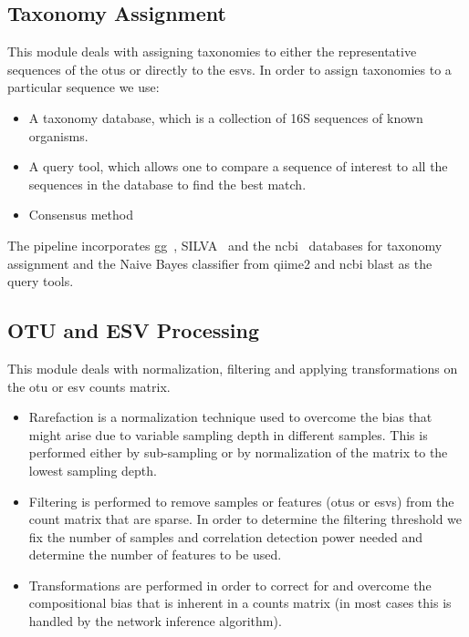   \subsection*{Taxonomy Assignment}
  \vspace{-5mm}
  This module deals with assigning taxonomies to either the representative sequences of the \ac{otu}s or directly to the \ac{esv}s.
  In order to assign taxonomies to a particular sequence we use:
  \begin{itemize}
    \item A taxonomy database, which is a collection of 16S sequences of known organisms.
    \item A query tool, which allows one to compare a sequence of interest to all the sequences in the database to find the best match.
    \item Consensus method
  \end{itemize}
  The pipeline incorporates \ac{gg}~\cite{DeSantis2006}, SILVA~\cite{Quast2012} and the \ac{ncbi}~\cite{Sayers2009} databases for taxonomy assignment and the Naive Bayes classifier from \ac{qiime2} and \ac{ncbi} blast as the query tools.

  \subsection*{OTU and ESV Processing}
  \vspace{-5mm}
  This module deals with normalization, filtering and applying transformations on the \ac{otu} or \ac{esv} counts matrix.
  \begin{itemize}
    \item Rarefaction is a normalization technique used to overcome the bias that might arise due to variable sampling depth in different samples. This is performed either by sub-sampling or by normalization of the matrix to the lowest sampling depth.
    \item Filtering is performed to remove samples or features (\ac{otu}s or \ac{esv}s) from the count matrix that are sparse. In order to determine the filtering threshold we fix the number of samples and correlation detection power needed  and determine the number of features to be used.
    \item Transformations are performed in order to correct for and overcome the compositional bias that is inherent in a counts matrix (in most cases this is handled by the network inference algorithm).
  \end{itemize}

